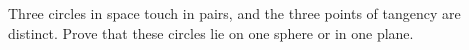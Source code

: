 Three circles in space touch in pairs, and the three points of tangency are distinct. Prove that these circles lie on one sphere or in one plane.
